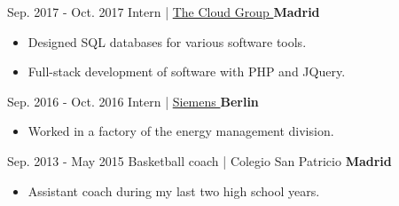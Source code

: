 \documentclass[]{commands}
\begin{document}
\begin{entrylist}
  \entry
    {Sep. 2017 - Oct. 2017}
    {Intern | }
    { \href{https://thecloud.group/}{\small The Cloud Group \faMousePointer}}
    {\normalsize\textbf{\color{ipsgreen}\faMapMarker\space Madrid}}
    {\jobspace
    \begin{itemize}[leftmargin=*, itemsep = 0.1em]
        \item Designed SQL databases for various software tools. 
        \item Full-stack development of software with PHP and JQuery. \\
    \end{itemize}}
    
  \entry
    {Sep. 2016 - Oct. 2016}
    {Intern | }
    { \href{https://www.siemens.com/global/en.html}{\small Siemens \faMousePointer}}
    {\normalsize\textbf{\color{ipsgreen}\faMapMarker\space Berlin}}
    {\jobspace
    \begin{itemize}[leftmargin=*, itemsep = 0.1em]
        \item Worked in a factory of the energy management division. \\
    \end{itemize}}
    
  \entry
    {Sep. 2013 - May 2015}
    {Basketball coach | }
    {{\small Colegio San Patricio}}
    {\normalsize\textbf{\color{ipsgreen}\faMapMarker\space Madrid}}
    {\jobspace
    \begin{itemize}[leftmargin=*, itemsep = 0.1em]
        \item Assistant coach during my last two high school years. \\
    \end{itemize}}

\end{entrylist}

\end{document}
